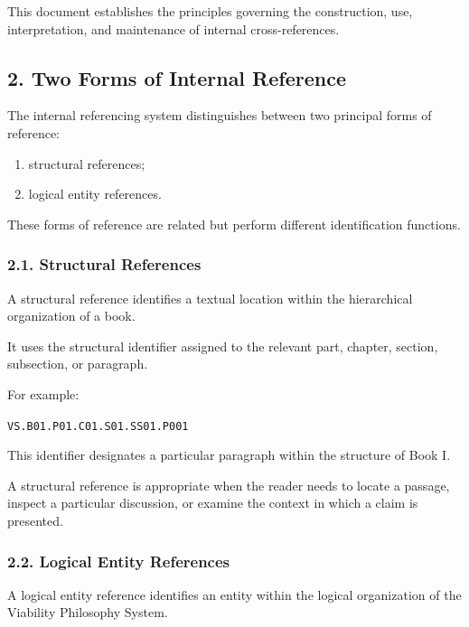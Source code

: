 This document establishes the principles governing
the construction, use, interpretation, and maintenance
of internal cross-references.


\subsection*{2. Two Forms of Internal Reference}

The internal referencing system distinguishes between
two principal forms of reference:

\begin{enumerate}
    \item structural references;
    \item logical entity references.
\end{enumerate}

These forms of reference are related but perform
different identification functions.

\subsubsection*{2.1. Structural References}

A structural reference identifies a textual location
within the hierarchical organization of a book.

It uses the structural identifier assigned to the
relevant part, chapter, section, subsection, or paragraph.

For example:

\begin{center}
    \texttt{VS.B01.P01.C01.S01.SS01.P001}
\end{center}

This identifier designates a particular paragraph
within the structure of Book I.

A structural reference is appropriate when the reader
needs to locate a passage, inspect a particular
discussion, or examine the context in which a claim
is presented.

\subsubsection*{2.2. Logical Entity References}

A logical entity reference identifies an entity
within the logical organization of the Viability
Philosophy System.

